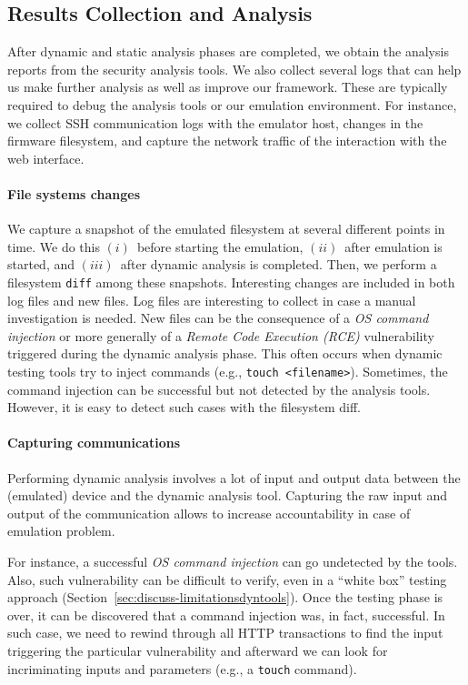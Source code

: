 \documentclass[conference]{./templates/ndss/IEEEtran}
\newcounter{t0d0_counter}
\newcounter{pr00f_counter}
\begin{document}
\subsection{Results Collection and Analysis}
\label{sec:results-collect-analysis}


After dynamic and static analysis phases are completed, we obtain the
analysis reports from the security analysis tools. 
We also collect several logs that can help us make
further analysis as well as improve our framework.  These are
typically required to debug the analysis tools or our emulation
environment.  For instance, we collect SSH communication logs with the
emulator host,
changes in the firmware filesystem, and capture the network traffic
of the interaction with the web interface.

\paragraph{File systems changes}
\label{sec:dyn-our-capt-fs}
We capture a snapshot of the emulated filesystem at several different 
points in time. We do this $(i)$~before starting the emulation, 
$(ii)$~after emulation is started, and $(iii)$~after dynamic analysis is completed. 
Then, we perform a filesystem \texttt{diff} among these snapshots.
Interesting changes are included in both log files and new files. Log files
are interesting to collect in case a manual investigation is needed.
New files can be the consequence of a \emph{OS command injection} or
more generally of a \emph{Remote Code Execution (RCE)} vulnerability
triggered during the dynamic analysis phase. This often occurs when
dynamic testing tools try to inject commands (e.g., \texttt{touch
  <filename>}). Sometimes, the command injection can be successful but not
detected by the analysis tools. However, it is easy to detect such cases with the filesystem 
diff.



\paragraph{Capturing communications}
\label{sec:dyn-our-capt-tcpdump}

Performing dynamic analysis involves a lot of input and output data 
between the (emulated) device and the dynamic analysis tool. 
Capturing the raw input and output of the communication allows to
increase accountability in case of emulation problem.

For instance, a successful \emph{OS command injection} can go undetected by the 
tools. Also, such vulnerability can be difficult to verify, 
even in a ``white box'' testing approach (Section~\ref{sec:discuss-limitationsdyntools}).
Once the testing phase is over,
it can be discovered that 
a command injection was, in fact, successful. 
In such case, we need to rewind through all HTTP transactions
to find the input triggering the particular vulnerability and afterward we can
look for incriminating inputs and parameters (e.g., a \texttt{touch} 
command).
\end{document}
